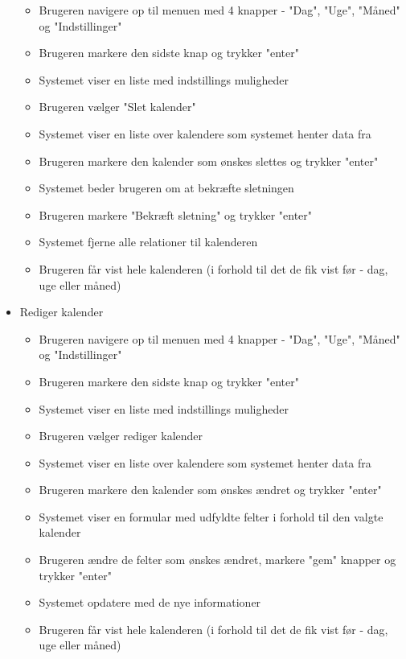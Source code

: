 \documentclass{article}
\begin{document}
\begin{itemize}
   \begin{itemize}
   \item Brugeren navigere op til menuen med 4 knapper - "Dag", "Uge", "Måned" og "Indstillinger"
   \item Brugeren markere den sidste knap og trykker "enter"
   \item Systemet viser en liste med indstillings muligheder
   \item Brugeren vælger "Slet kalender"
   \item Systemet viser en liste over kalendere som systemet henter data fra
   \item Brugeren markere den kalender som ønskes slettes og trykker "enter"
   \item Systemet beder brugeren om at bekræfte sletningen
   \item Brugeren markere "Bekræft sletning" og trykker "enter"
   \item Systemet fjerne alle relationer til kalenderen
   \item Brugeren får vist hele kalenderen (i forhold til det de fik vist før - dag, uge eller måned)
   \end{itemize}
   \item Rediger kalender
   \begin{itemize}
   \item Brugeren navigere op til menuen med 4 knapper - "Dag", "Uge", "Måned" og "Indstillinger"
   \item Brugeren markere den sidste knap og trykker "enter"
   \item Systemet viser en liste med indstillings muligheder
   \item Brugeren vælger rediger kalender
   \item Systemet viser en liste over kalendere som systemet henter data fra
   \item Brugeren markere den kalender som ønskes ændret og trykker "enter"
   \item Systemet viser en formular med udfyldte felter i forhold til den valgte kalender
   \item Brugeren ændre de felter som ønskes ændret, markere "gem" knapper og trykker "enter"
   \item Systemet opdatere med de nye informationer
   \item Brugeren får vist hele kalenderen (i forhold til det de fik vist før - dag, uge eller måned)
   \end{itemize}
   \end{itemize}
   
\end{document}
